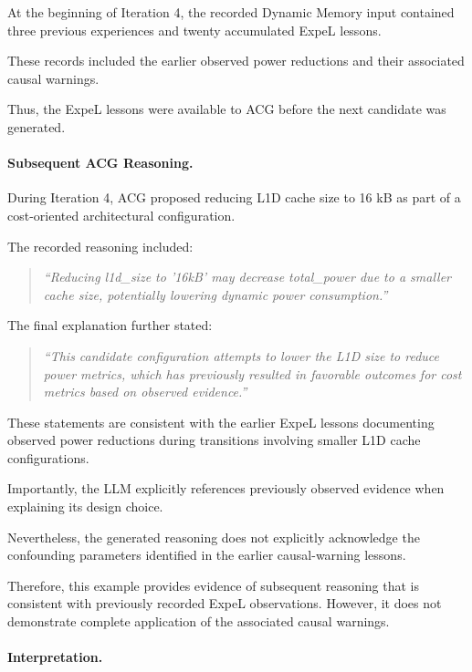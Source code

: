 At the beginning of Iteration 4, the recorded
Dynamic Memory input contained three previous
experiences and twenty accumulated ExpeL
lessons.

These records included the earlier observed
power reductions and their associated
causal warnings.

Thus, the ExpeL lessons were available to
ACG before the next candidate was generated.

\paragraph{Subsequent ACG Reasoning.}

During Iteration 4, ACG proposed reducing
L1D cache size to 16 kB as part of a
cost-oriented architectural configuration.

The recorded reasoning included:

\begin{quote}
\emph{``Reducing l1d\_size to '16kB' may decrease
total\_power due to a smaller cache size,
potentially lowering dynamic power consumption.''}
\end{quote}

The final explanation further stated:

\begin{quote}
\emph{``This candidate configuration attempts
to lower the L1D size to reduce power metrics,
which has previously resulted in favorable
outcomes for cost metrics based on observed
evidence.''}
\end{quote}

These statements are consistent with the
earlier ExpeL lessons documenting observed
power reductions during transitions involving
smaller L1D cache configurations.

Importantly, the LLM explicitly references
previously observed evidence when explaining
its design choice.

Nevertheless, the generated reasoning does
not explicitly acknowledge the confounding
parameters identified in the earlier
causal-warning lessons.

Therefore, this example provides evidence of
subsequent reasoning that is consistent with
previously recorded ExpeL observations. However, it does not demonstrate complete application
of the associated causal warnings.

\paragraph{Interpretation.}

